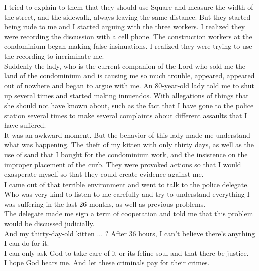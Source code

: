 \documentclass[11pt]{book}
\begin{document}
\noindent I tried to explain to them that they should use Square and measure the width of the street, and the sidewalk, always leaving the same distance. But they started being rude to me and I started arguing with the three workers. I realized they were recording the discussion with a cell phone. The construction workers at the condominium began making false insinuations. I realized they were trying to use the recording to incriminate me. \\

\noindent Suddenly the lady, who is the current companion of the Lord who sold me the land of the condominium and is causing me so much trouble, appeared, appeared out of nowhere and began to argue with me. An 80-year-old lady told me to shut up several times and started making innuendos. With allegations of things that she should not have known about, such as the fact that I have gone to the police station several times to make several complaints about different assaults that I have suffered. \\

\noindent It was an awkward moment. But the behavior of this lady made me understand what was happening. The theft of my kitten with only thirty days, as well as the use of sand that I bought for the condominium work, and the insistence on the improper placement of the curb. They were provoked actions so that I would exasperate myself so that they could create evidence against me. \\

\noindent I came out of that terrible environment and went to talk to the police delegate. Who was very kind to listen to me carefully and try to understand everything I was suffering in the last 26 months, as well as previous problems. \\

\noindent The delegate made me sign a term of cooperation and told me that this problem would be discussed judicially. \\

\noindent And my thirty-day-old kitten ... ? After 36 hours, I can't believe there's anything I can do for it. \\

\noindent I can only ask God to take care of it or its feline soul and that there be justice. \\

\noindent I hope God hears me. And let these criminals pay for their crimes. \\
\end{document}
